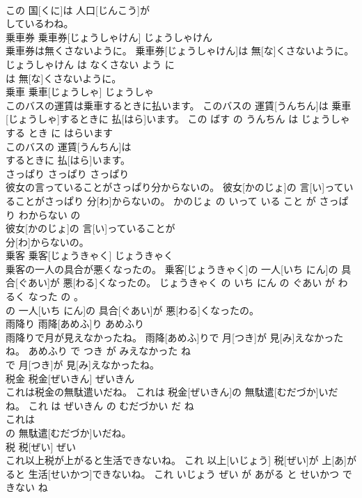 \documentclass[8pt]{extreport}
\begin{document}
\begin{CJK}{UTF8}{min}
\\	この 国[くに]は 人口[じんこう]が
\\	しているわね。			
\\	乗車券	乗車券[じょうしゃけん]	じょうしゃけん	
\\	乗車券は無くさないように。	乗車券[じょうしゃけん]は 無[な]くさないように。	じょうしゃけん は なくさない よう に	
\\	は 無[な]くさないように。			
\\	乗車	乗車[じょうしゃ]	じょうしゃ	
\\	このバスの運賃は乗車するときに払います。	このバスの 運賃[うんちん]は 乗車[じょうしゃ]するときに 払[はら]います。	この ばす の うんちん は じょうしゃ する とき に はらいます	
\\	このバスの 運賃[うんちん]は
\\	するときに 払[はら]います。			
\\	さっぱり	さっぱり	さっぱり	
\\	彼女の言っていることがさっぱり分からないの。	彼女[かのじょ]の 言[い]っていることがさっぱり 分[わ]からないの。	かのじょ の いって いる こと が さっぱり わからない の	
\\	彼女[かのじょ]の 言[い]っていることが
\\	分[わ]からないの。			
\\	乗客	乗客[じょうきゃく]	じょうきゃく	
\\	乗客の一人の具合が悪くなったの。	乗客[じょうきゃく]の 一人[いち にん]の 具合[ぐあい]が 悪[わる]くなったの。	じょうきゃく の いち にん の ぐあい が わるく なった の 。	
\\	の 一人[いち にん]の 具合[ぐあい]が 悪[わる]くなったの。			
\\	雨降り	雨降[あめふ]り	あめふり	
\\	雨降りで月が見えなかったね。	雨降[あめふ]りで 月[つき]が 見[み]えなかったね。	あめふり で つき が みえなかった ね	
\\	で 月[つき]が 見[み]えなかったね。			
\\	税金	税金[ぜいきん]	ぜいきん	
\\	これは税金の無駄遣いだね。	これは 税金[ぜいきん]の 無駄遣[むだづか]いだね。	これ は ぜいきん の むだづかい だ ね	
\\	これは
\\	の 無駄遣[むだづか]いだね。			
\\	税	税[ぜい]	ぜい	
\\	これ以上税が上がると生活できないね。	これ 以上[いじょう] 税[ぜい]が 上[あ]がると 生活[せいかつ]できないね。	これ いじょう ぜい が あがる と せいかつ できない ね	

\end{CJK}
\end{document}
